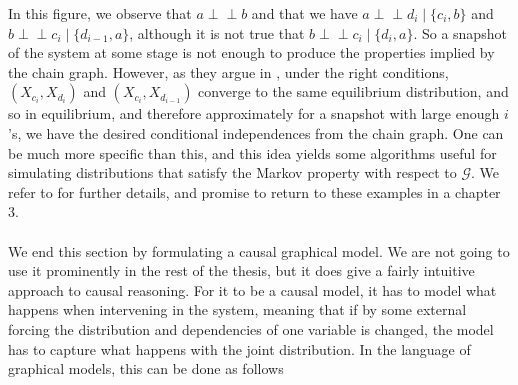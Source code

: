 \documentclass[11pt, a4paper]{memoir}
\theoremstyle{break}
\theoremstyle{break}
\theoremstyle{nonumberplain}
\newcommand{\indep}{\perp \!\!\! \perp}
\begin{document}
In this figure, we observe that $a\indep b$ and that we have $a\indep d_i\mid \{c_i,b\}$ and $b\indep c_i\mid\{d_{i-1},a\}$, although it is not true that $b\indep c_i\mid\{d_i,a\}$. So a snapshot of the system at some stage is not enough to produce the properties implied by the chain graph. However, as they argue in \cite{ChainGraph}, under the right conditions, $(X_{c_i},X_{d_i})$ and $(X_{c_i},X_{d_{i-1}})$ converge to the same equilibrium distribution, and so in equilibrium, and therefore approximately for a snapshot with large enough $i$'s, we have the desired conditional independences from the chain graph. One can be much more specific than this, and this idea yields some algorithms useful for simulating distributions that satisfy the Markov property with respect to $\mathcal{G}$. We refer to \cite{ChainGraph} for further details, and promise to return to these examples in a chapter 3.\\\\
We end this section by formulating a causal graphical model. We are not going to use it prominently in the rest of the thesis, but it does give a fairly intuitive approach to causal reasoning. For it to be a causal model, it has to model what happens when intervening in the system, meaning that if by some external forcing the distribution and dependencies of one variable is changed, the model has to capture what happens with the joint distribution. In the language of graphical models, this can be done as follows
\end{document}
